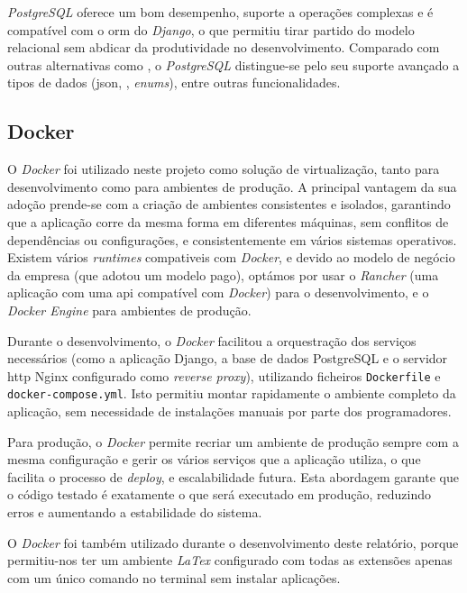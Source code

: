 \textit{PostgreSQL} oferece um bom desempenho, suporte a operações complexas e é compatível com o \gls{orm} do \textit{Django}, o que permitiu tirar partido do modelo relacional sem abdicar da produtividade no desenvolvimento. Comparado com outras alternativas como , o \textit{PostgreSQL} distingue-se pelo seu suporte avançado a tipos de dados (\gls{json}, , \textit{enums}), entre outras funcionalidades.


\subsection{Docker}

O \textit{Docker} foi utilizado neste projeto como solução de virtualização, tanto para desenvolvimento como para ambientes de produção. A principal vantagem da sua adoção prende-se com a criação de ambientes consistentes e isolados, garantindo que a aplicação corre da mesma forma em diferentes máquinas, sem conflitos de dependências ou configurações, e consistentemente em vários sistemas operativos. Existem vários \textit{runtimes} compativeis com \textit{Docker}, e devido ao modelo de negócio da empresa (que adotou um modelo pago), optámos por usar o \textit{Rancher} (uma aplicação com uma \gls{api} compatível com \textit{Docker}) para o desenvolvimento, e o \textit{Docker Engine} para ambientes de produção.

Durante o desenvolvimento, o \textit{Docker} facilitou a orquestração dos serviços necessários (como a aplicação Django, a base de dados PostgreSQL e o servidor \gls{http} Nginx configurado como \textit{reverse proxy}), utilizando ficheiros \texttt{Dockerfile} e \texttt{docker-compose.yml}. Isto permitiu montar rapidamente o ambiente completo da aplicação, sem necessidade de instalações manuais por parte dos programadores.

Para produção, o \textit{Docker} permite recriar um ambiente de produção sempre com a mesma configuração e gerir os vários serviços que a aplicação utiliza, o que facilita o processo de \textit{deploy}, e escalabilidade futura. Esta abordagem garante que o código testado é exatamente o que será executado em produção, reduzindo erros e aumentando a estabilidade do sistema.

O \textit{Docker} foi também utilizado durante o desenvolvimento deste relatório, porque permitiu-nos ter um ambiente \textit{LaTex} configurado com todas as extensões apenas com um único comando no terminal sem instalar aplicações.

